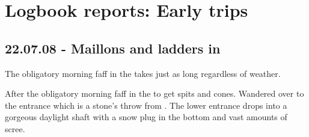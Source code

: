 \section{Logbook reports: Early trips}

\subsection{22.07.08 - Maillons and ladders in \protect{}}


\begin{marginfigure}
\checkoddpage \ifoddpage \forcerectofloat \else \forceversofloat \fi
\centering
 \caption{The obligatory morning faff in the \protect{} takes just as long regardless of weather. }
 \label{sunny morning bivi}
\end{marginfigure}


After the obligatory morning faff in the   to get spits and cones.
Wandered over to the entrance which is a stone's throw from .
The lower entrance drops into a gorgeous daylight shaft with a snow plug
in the bottom and vast amounts of scree.

